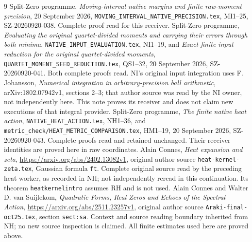 \documentclass[11pt]{article}
\begin{document}
\begin{thebibliography}{9}
 Split-Zero programme, \emph{Moving-interval native margins
and finite raw-moment precision}, 20 September 2026,
\texttt{MOVING\_INTERVAL\_NATIVE\_PRECISION.tex}, MI1--25,
SZ-20260920-038. Complete proof read for this receiver.
 Split-Zero programme, \emph{Evaluating the original
quartet-divided moments and carrying their errors through both minima},
\texttt{NATIVE\_INPUT\_EVALUATION.tex}, NI1--19, and
\emph{Exact finite input reduction for the original quartet-divided moments},
\texttt{QUARTET\_MOMENT\_SEED\_REDUCTION.tex}, QS1--32,
20 September 2026, SZ-20260920-041. Both complete proofs read.
NI's original input integration uses F. Johansson,
\emph{Numerical integration in arbitrary-precision ball arithmetic},
arXiv:1802.07942v1, sections 2--3; that author source was read by the
NI owner, not independently here. This note proves its receiver and
does not claim new executions of that integral provider.
 Split-Zero programme, \emph{The finite native heat action},
\texttt{NATIVE\_HEAT\_ACTION.tex}, NH1--36, and
\texttt{metric\_check/HEAT\_METRIC\_COMPARISON.tex}, HM1--19,
20 September 2026, SZ-20260920-043. Complete proofs read and retained
unchanged. Their receiver identities are proved here in raw coordinates.
 Alain Connes, \emph{Heat expansion and zeta},
\url{https://arxiv.org/abs/2402.13082v1}, original author source
\texttt{heat-kernel-zeta.tex}, Gaussian formula \texttt{ft}.
Complete original source read by the preceding heat worker, as recorded
in NH; not independently reread in this continuation. Its theorem
\texttt{heatkernelintro} assumes RH and is not used.
 Alain Connes and Walter D. van Suijlekom,
\emph{Quadratic Forms, Real Zeros and Echoes of the Spectral Action},
\url{https://arxiv.org/abs/2511.23257v1}, original author source
\texttt{Araki-final-oct25.tex}, section \texttt{sect:sa}.
Context and source reading boundary inherited from NH; no new source
inspection is claimed. All finite estimates used here are proved above.
\end{thebibliography}
\end{document}
